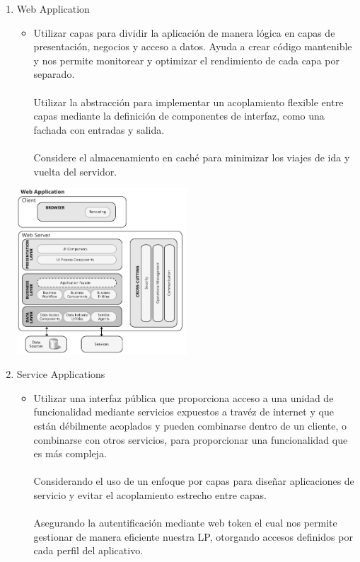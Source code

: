 \documentclass[10pt,a4paper,openany]{book}
\begin{document}
\begin{enumerate}
\item Web Application
\begin{itemize}
	\item Utilizar capas para dividir la aplicación de manera lógica en capas de presentación, negocios y acceso a datos. Ayuda a crear código mantenible y nos permite monitorear y optimizar el rendimiento de cada capa por separado.\\\\
Utilizar la abstracción para implementar un acoplamiento flexible entre capas mediante la definición de componentes de interfaz, como una fachada con entradas y salida.\\\\
Considere el almacenamiento en caché para minimizar los viajes de ida y vuelta del servidor.
\end{itemize}
\begin{center}
\includegraphics[width=0.5\textwidth]{arq1}
\end{center}
\item Service Applications
\begin{itemize}
	\item Utilizar una interfaz pública que proporciona acceso a una unidad de funcionalidad mediante servicios expuestos a travéz de internet y que están débilmente acoplados y pueden combinarse dentro de un cliente, o combinarse con otros servicios, para proporcionar una funcionalidad que es más compleja.\\\\
	Considerando el uso de un enfoque por capas para diseñar aplicaciones de servicio y evitar el acoplamiento estrecho entre capas.\\\\
	Asegurando la autentificación mediante web token el cual nos permite gestionar de manera eficiente nuestra LP, otorgando accesos definidos por cada perfil del aplicativo.

\end{itemize}
\end{enumerate}
\end{document}
